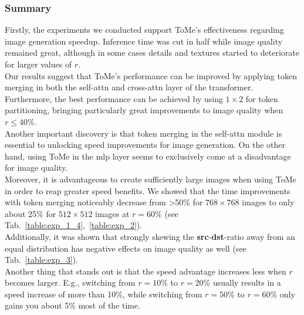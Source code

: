 \subsubsection*{Summary}
Firstly, the experiments we conducted support ToMe's effectiveness regarding image generation speedup. Inference time was cut in half while image quality remained great, although in some cases details and textures started to deteriorate for larger values of \(r\).\\
Our results suggest that ToMe's performance can be improved by applying token merging in both the self-attn and cross-attn layer of the transformer. Furthermore, the best performance can be achieved by using $1 \times 2$ for token partitioning, bringing particularly great improvements to image quality when \(r\leq40\%\).\\
Another important discovery is that token merging in the self-attn module is essential to unlocking speed improvements for image generation. On the other hand, using ToMe in the mlp layer seems to exclusively come at a disadvantage for image quality.\\
Moreover, it is advantageous to create sufficiently large images when using ToMe in order to reap greater speed benefits. We showed that the time improvements with token merging noticeably decrease from >50\% for $768 \times 768$ images to only about 25\% for $512 \times 512$ images at \(r=60\%\) (see Tab.~\ref{table:exp_1_4},~\ref{table:exp_2}).\\
Additionally, it was shown that strongly skewing the \textbf{src}-\textbf{dst}-ratio away from an equal distribution has negative effects on image quality as well (see Tab.~\ref{table:exp_3}).\\
Another thing that stands out is that the speed advantage increases less when \(r\) becomes larger. E.g., switching from \(r=10\%\) to \(r=20\%\) usually results in a speed increase of more than 10\%, while switching from \(r=50\%\) to \(r=60\%\) only gains you about 5\% most of the time.
